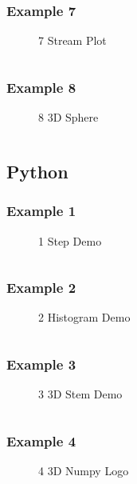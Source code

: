 \subsubsection{Example 7}
\begin{figure}[!htb]
    \centering
    
    \caption{7 Stream Plot}
    \label{fig:7-stream-plot}
\end{figure}
\inputminted{mathematica}{./Example/example_7.wls}
\newpage

\subsubsection{Example 8}
\begin{figure}[!htb]
    \centering
    
    \caption{8 3D Sphere}
    \label{fig:8-3d-sphere}
\end{figure}
\inputminted{mathematica}{./Example/example_8.wls}
\newpage


\subsection{Python}
\subsubsection{Example 1}
\begin{figure}[!htb]
    \centering
    
    \caption{1 Step Demo}
    \label{fig:1-step-demo}
\end{figure}
\inputminted{python}{./Example/example_1.mpl}
\newpage


\subsubsection{Example 2}
\begin{figure}[!htb]
    \centering
    
    \caption{2 Histogram Demo}
    \label{fig:2-histogram-demo}
\end{figure}
\inputminted{python}{./Example/example_2.mpl}
\newpage


\subsubsection{Example 3}
\begin{figure}[!htb]
    \centering
    
    \caption{3 3D Stem Demo}
    \label{fig:3-3d-stem-demo}
\end{figure}
\inputminted{python}{./Example/example_3.mpl}
\newpage

\subsubsection{Example 4}
\begin{figure}[!htb]
    \centering
    
    \caption{4 3D Numpy Logo}
    \label{fig:4-numpy-logo}
\end{figure}
\inputminted{python}{./Example/example_4.mpl}
\newpage

